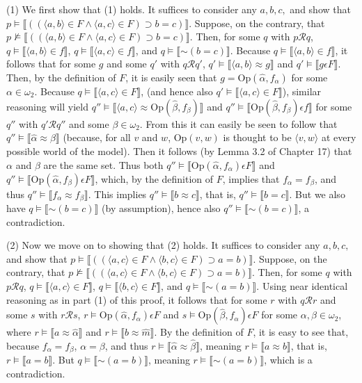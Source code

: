 \documentclass{article}
\newcommand*{\oldneg}{\mathord{\sim}}
\newcommand{\lbc}{\llbracket}
\newcommand{\rbc}{\rrbracket}
\theoremstyle{definition}
\begin{document}
(1) We first show that (1) holds. It suffices to consider any $a,b,c,$ and show that 
$p\vDash\lbc((\langle a,b\rangle\in F\wedge\langle a,c\rangle\in F)\supset b=c)\rbc$. Suppose, on the contrary, that 
$p\nvDash\lbc((\langle a,b\rangle\in F\wedge\langle a,c\rangle\in F)\supset b=c)\rbc$. Then, for some $q$ with 
$p\mathcal{R}q$, $q\vDash\lbc\langle a,b\rangle\in f\rbc$, $q\vDash\lbc\langle a,c\rangle\in f\rbc$, and $q\vDash\lbc\oldneg(b=c)\rbc$. Because 
$q\vDash\lbc\langle a,b\rangle\in f\rbc$, it follows that for some $g$ and some $q'$ with $q\mathcal{R}q'$,
$q'\vDash\lbc\langle a,b\rangle\approx g\rbc$ and $q'\vDash\lbc g\epsilon F\rbc$. Then, by the definition of $F$,
it is easily seen that $g=\textrm{Op}(\hat{\alpha},f_\alpha)$ for some $\alpha\in\omega_2$. Because $q\vDash\lbc\langle a,c\rangle\in F\rbc$, 
(and hence also $q'\vDash\lbc\langle a,c\rangle\in F\rbc$), similar reasoning will yield
$q''\vDash\lbc\langle a,c\rangle\approx\textrm{Op}(\hat{\beta},f_\beta)\rbc$ and
$q''\vDash\lbc\textrm{Op}(\hat{\beta},f_\beta)\epsilon f\rbc$ for some $q''$ with $q'\mathcal{R}q''$ and some 
$\beta\in\omega_2$. From this it can easily be seen to follow that $q''\vDash\lbc\hat{\alpha}\approx\hat{\beta}\rbc$ (because, 
for all $v$ and $w$, $\textrm{Op}(v,w)$ is thought to be $\langle v,w\rangle$ at every possible world of the model). Then 
it follows (by Lemma 3.2 of Chapter 17) that $\alpha$ and $\beta$ are the same set. Thus both $q''\vDash\lbc\textrm{Op}(\hat{\alpha},f_\alpha)\epsilon F\rbc$
and $q''\vDash\lbc\textrm{Op}(\hat{\alpha},f_\beta)\epsilon F\rbc$, which, by the definition of $F$, implies that 
$f_\alpha=f_\beta$, and thus $q''\vDash\lbc f_\alpha\approx f_\beta\rbc$. This implies $q''\vDash\lbc b\approx c\rbc$, 
that is, $q''\vDash\lbc b=c\rbc$. But we also have 
$q\vDash\lbc\oldneg (b=c)\rbc$ (by assumption), hence also $q''\vDash\lbc\oldneg(b=c)\rbc$, a contradiction. 

(2) Now we move on to showing that (2) holds. It suffices to consider any $a,b,c,$ and show that 
$p\vDash\lbc((\langle a,c\rangle\in F\wedge\langle b,c\rangle\in F)\supset a=b)\rbc$. Suppose, on the contrary, that 
$p\nvDash\lbc((\langle a,c\rangle\in F\wedge\langle b,c\rangle\in F)\supset a=b)\rbc$. Then, for some $q$ with $p\mathcal{R}q$,
$q\vDash\lbc\langle a,c\rangle\in F\rbc$, $q\vDash\lbc\langle b,c\rangle\in F\rbc$, and $q\vDash\lbc\oldneg(a=b)\rbc$. Using near 
identical reasoning as in part (1) of this proof, it follows that for some $r$ with $q\mathcal{R}r$ and some 
$s$ with $r\mathcal{R}s$, $r\vDash\textrm{Op}(\hat{\alpha},f_\alpha)\epsilon F$ and
$s\vDash\textrm{Op}(\hat{\beta},f_\alpha)\epsilon F$ for some $\alpha,\beta\in\omega_2$, where 
$r\vDash\lbc a\approx\hat{\alpha}\rbc$ and $r\vDash\lbc b\approx\hat{m}\rbc$. By the definition of $F$, it is easy 
to see that, because $f_\alpha=f_\beta$, $\alpha=\beta$, and thus 
$r\vDash\lbc\hat{\alpha}\approx\hat{\beta}\rbc$, meaning $r\vDash\lbc a\approx b\rbc$, that is, 
$r\vDash\lbc a=b\rbc$. But $q\vDash\lbc\oldneg(a=b)\rbc$, meaning $r\vDash\lbc\oldneg(a=b)\rbc$, which is a 
contradiction.
\end{document}
